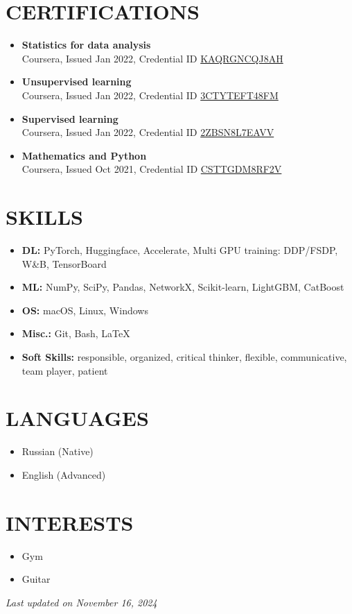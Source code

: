 \documentclass[11pt,a4paper]{moderncv}
\begin{document}
\section{CERTIFICATIONS}
\begin{itemize}
    \item \textbf{Statistics for data analysis}\\ Coursera, Issued Jan 2022, Credential ID \href{https://www.coursera.org/account/accomplishments/certificate/KAQRGNCQJ8AH}{KAQRGNCQJ8AH}
    \item \textbf{Unsupervised learning}\\ Coursera, Issued Jan 2022, Credential ID \href{https://www.coursera.org/account/accomplishments/certificate/3CTYTEFT48FM}{3CTYTEFT48FM}
    \item \textbf{Supervised learning}\\ Coursera, Issued Jan 2022, Credential ID \href{https://www.coursera.org/account/accomplishments/certificate/2ZBSN8L7EAVV}{2ZBSN8L7EAVV}
    \item \textbf{Mathematics and Python}\\ Coursera, Issued Oct 2021, Credential ID \href{https://www.coursera.org/account/accomplishments/certificate/CSTTGDM8RF2V}{CSTTGDM8RF2V}
\end{itemize}

\section{SKILLS}
\begin{itemize}
    \item \textbf{DL:} PyTorch, Huggingface, Accelerate, Multi GPU training: DDP/FSDP, W\&B, TensorBoard
    \item \textbf{ML:} NumPy, SciPy, Pandas, NetworkX, Scikit-learn, LightGBM, CatBoost
    \item \textbf{OS:} macOS, Linux, Windows
    \item \textbf{Misc.:} Git, Bash, \LaTeX
    \item \textbf{Soft Skills:} responsible, organized, critical thinker, flexible, communicative, team player, patient
\end{itemize}

\section{LANGUAGES}
\begin{itemize}
    \item Russian (Native)
    \item English (Advanced)
\end{itemize}

\section{INTERESTS}
\begin{itemize}
    \item Gym
    \item Guitar
\end{itemize}

\vspace{\fill}
\begin{center}
\textit{Last updated on November 16, 2024}
\end{center}
\vspace{-1.5cm}
\end{document}

